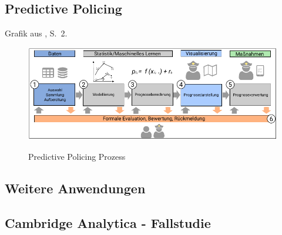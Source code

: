 








\subsection{Predictive Policing}

Grafik aus \cite{Bode}, S.~2.

\begin{figure}%
\centering
\caption{Predictive Policing Prozess}
\includegraphics[scale=1.1]{Grafiken/Predictive_Policing_Ink.pdf} 
\label{pic:Predictive_Policing}
\end{figure}

\subsection{Weitere Anwendungen}

\subsection{Cambridge Analytica - Fallstudie}


